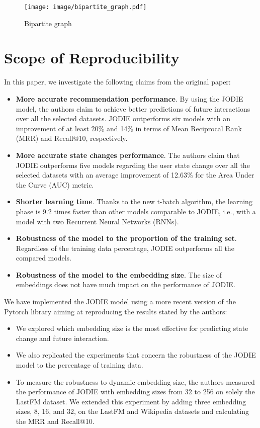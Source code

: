 %
%
\begin{figure}[htbp]
    \centering
    \texttt{[image: image/bipartite\_graph.pdf]}
    \caption{Bipartite graph}
    \label{bipartite_graph}
\end{figure}


\section*{Scope of Reproducibility}

In this paper, we investigate the following claims from the original paper:
\begin{itemize}
    \item \textbf{More accurate recommendation performance}. By using the JODIE model, the authors claim to achieve better predictions of future interactions over all the selected datasets. JODIE outperforms six models with an improvement of at least 20\% and 14\%  in terms of Mean Reciprocal Rank (MRR) and Recall@10, respectively.
    \item \textbf{More accurate state changes performance}. The authors claim that JODIE outperforms five models regarding the user state change over all the selected datasets with an average improvement of 12.63\% for the Area Under the Curve (AUC) metric.
    \item \textbf{Shorter learning time}. Thanks to the new t-batch algorithm, the learning phase is 9.2 times faster than other models comparable to JODIE, i.e., with a model with two Recurrent Neural Networks (RNNs).
    \item \textbf{Robustness of the model to the proportion of the training set}. Regardless of the training data percentage, JODIE outperforms all the compared models.
    \item \textbf{Robustness of the model to the embedding size}. The size of embeddings does not have much impact on the performance of JODIE.
\end{itemize}
We have implemented the JODIE model using a more recent version of the Pytorch library aiming at reproducing the results stated by the authors:
\begin{itemize}
    \item We explored which embedding size is the most effective for predicting state change and future interaction.
    \item We also replicated the experiments that concern the robustness of the JODIE model to the percentage of training data.
    \item To measure the robustness to dynamic embedding size, the authors measured the performance of JODIE with embedding sizes from 32 to 256 on solely the LastFM dataset. We extended this experiment by adding three embedding sizes, 8, 16, and 32, on the LastFM and Wikipedia datasets and calculating the MRR and Recall@10.
\end{itemize}
